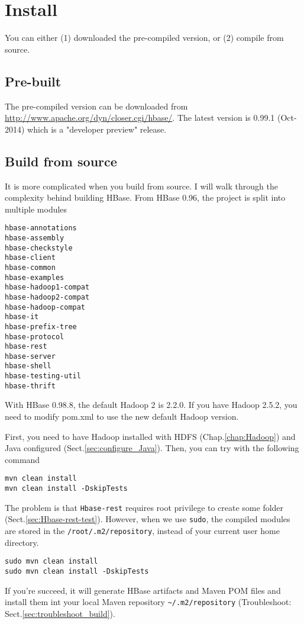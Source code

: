 \section{Install}  

You can either (1) downloaded the pre-compiled version, or (2) compile from
source. 

\subsection{Pre-built}

The pre-compiled version can be downloaded from
\url{http://www.apache.org/dyn/closer.cgi/hbase/}.
The latest version is 0.99.1 (Oct-2014) which is a "developer preview" release.

\subsection{Build from source}

It is more complicated when you build from source. I will walk through the
complexity behind building HBase. From HBase 0.96, the project is split into
multiple modules
\begin{verbatim}
hbase-annotations
hbase-assembly
hbase-checkstyle
hbase-client
hbase-common
hbase-examples
hbase-hadoop1-compat
hbase-hadoop2-compat
hbase-hadoop-compat
hbase-it
hbase-prefix-tree
hbase-protocol
hbase-rest
hbase-server
hbase-shell
hbase-testing-util
hbase-thrift
\end{verbatim}

With HBase 0.98.8, the default Hadoop 2 is 2.2.0. If you have Hadoop 2.5.2, you
need to modify pom.xml to use the new default Hadoop version.

First, you need to have Hadoop installed with HDFS (Chap.\ref{chap:Hadoop}) and
Java configured (Sect.\ref{sec:configure_Java}). Then, you can try with the
following command
\begin{verbatim}
mvn clean install
mvn clean install -DskipTests
\end{verbatim}
The problem is that \verb!Hbase-rest! requires root privilege to create some
folder (Sect.\ref{sec:Hbase-rest-test}). However, when we use \verb!sudo!, the
compiled modules are stored in the \verb!/root/.m2/repository!, instead of your current user home directory.

\begin{verbatim}
sudo mvn clean install
sudo mvn clean install -DskipTests
\end{verbatim}
If you're succeed, it will generate HBase artifacts and Maven POM files and
install them int your local Maven repository \verb!~/.m2/repository!
(Troubleshoot: Sect.\ref{sec:troubleshoot_build}). 

